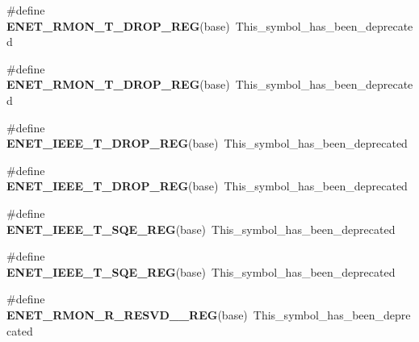 \begin{DoxyCompactItemize}
\item 
\#define {\bfseries E\+N\+E\+T\+\_\+\+R\+M\+O\+N\+\_\+\+T\+\_\+\+D\+R\+O\+P\+\_\+\+R\+EG}(base)~This\+\_\+symbol\+\_\+has\+\_\+been\+\_\+deprecated\hypertarget{group__Backward__Compatibility__Symbols_ga4f954021c38e1312f369f2d506e849fb}{}\label{group__Backward__Compatibility__Symbols_ga4f954021c38e1312f369f2d506e849fb}

\item 
\#define {\bfseries E\+N\+E\+T\+\_\+\+R\+M\+O\+N\+\_\+\+T\+\_\+\+D\+R\+O\+P\+\_\+\+R\+EG}(base)~This\+\_\+symbol\+\_\+has\+\_\+been\+\_\+deprecated\hypertarget{group__Backward__Compatibility__Symbols_ga4f954021c38e1312f369f2d506e849fb}{}\label{group__Backward__Compatibility__Symbols_ga4f954021c38e1312f369f2d506e849fb}

\item 
\#define {\bfseries E\+N\+E\+T\+\_\+\+I\+E\+E\+E\+\_\+\+T\+\_\+\+D\+R\+O\+P\+\_\+\+R\+EG}(base)~This\+\_\+symbol\+\_\+has\+\_\+been\+\_\+deprecated\hypertarget{group__Backward__Compatibility__Symbols_ga846ebd730ff995e90e8ef967f0d3190b}{}\label{group__Backward__Compatibility__Symbols_ga846ebd730ff995e90e8ef967f0d3190b}

\item 
\#define {\bfseries E\+N\+E\+T\+\_\+\+I\+E\+E\+E\+\_\+\+T\+\_\+\+D\+R\+O\+P\+\_\+\+R\+EG}(base)~This\+\_\+symbol\+\_\+has\+\_\+been\+\_\+deprecated\hypertarget{group__Backward__Compatibility__Symbols_ga846ebd730ff995e90e8ef967f0d3190b}{}\label{group__Backward__Compatibility__Symbols_ga846ebd730ff995e90e8ef967f0d3190b}

\item 
\#define {\bfseries E\+N\+E\+T\+\_\+\+I\+E\+E\+E\+\_\+\+T\+\_\+\+S\+Q\+E\+\_\+\+R\+EG}(base)~This\+\_\+symbol\+\_\+has\+\_\+been\+\_\+deprecated\hypertarget{group__Backward__Compatibility__Symbols_ga534c1bbf70fea82ca5a237985faa5ab9}{}\label{group__Backward__Compatibility__Symbols_ga534c1bbf70fea82ca5a237985faa5ab9}

\item 
\#define {\bfseries E\+N\+E\+T\+\_\+\+I\+E\+E\+E\+\_\+\+T\+\_\+\+S\+Q\+E\+\_\+\+R\+EG}(base)~This\+\_\+symbol\+\_\+has\+\_\+been\+\_\+deprecated\hypertarget{group__Backward__Compatibility__Symbols_ga534c1bbf70fea82ca5a237985faa5ab9}{}\label{group__Backward__Compatibility__Symbols_ga534c1bbf70fea82ca5a237985faa5ab9}

\item 
\#define {\bfseries E\+N\+E\+T\+\_\+\+R\+M\+O\+N\+\_\+\+R\+\_\+\+R\+E\+S\+V\+D\+\_\+\_\+\+R\+EG}(base)~This\+\_\+symbol\+\_\+has\+\_\+been\+\_\+deprecated\hypertarget{group__Backward__Compatibility__Symbols_ga911420e8f14b5d4711e0cec193358811}{}\label{group__Backward__Compatibility__Symbols_ga911420e8f14b5d4711e0cec193358811}


\end{DoxyCompactItemize}
